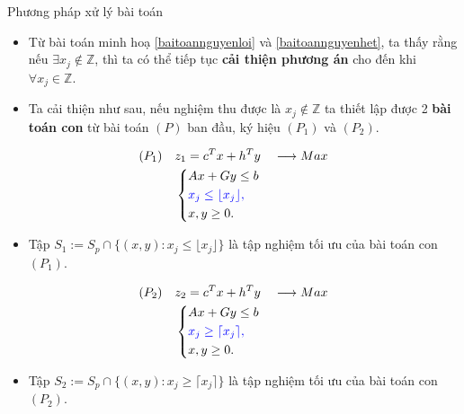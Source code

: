 \documentclass[10pt]{beamer}
\begin{document}
\begin{frame}{Phương pháp xử lý bài toán}
\large
\begin{itemize}
\item Từ bài toán minh hoạ \eqref{baitoannguyenloi} và \eqref{baitoannguyenhet}, ta thấy rằng nếu $\exists x_j \notin \mathbb{Z}$, thì ta có thể tiếp tục \textbf{cải thiện phương án} cho đến khi $\forall x_j \in \mathbb{Z}$. 
\bigskip
\item Ta cải thiện như sau, nếu nghiệm thu được là $x_j \notin \mathbb{Z}$ ta thiết lập được 2 \textbf{bài toán con} từ bài toán $(P)$ ban đầu, ký hiệu $(P_1)$ và $(P_2)$.
\end{itemize}
\end{frame}

\begin{frame}
\begin{equation}
    \begin{split}
    (P_1) \quad & z_1=c^Tx+h^Ty \quad \longrightarrow Max \\
                & \left\{\begin{split}
                    &Ax+Gy \leq  b \\
                    &\color{blue} x_j \leq \lfloor x_j \rfloor , \\
                    &x,y \geq 0.
                \end{split}\right.    
    \end{split}
\end{equation}
\begin{itemize}
\item Tập $S_1:=S_p \cap \{ (x,y): x_j \leq \lfloor x_j \rfloor \}$ là tập nghiệm tối ưu của bài toán con $(P_1)$.
\end{itemize}
\end{frame}

\begin{frame}
\begin{equation}
    \begin{split}
    (P_2) \quad & z_2=c^Tx+h^Ty \quad \longrightarrow Max \\
                & \left\{\begin{split}
                    &Ax+Gy \leq  b \\
                    &\color{blue} x_j \geq \lceil x_j \rceil , \\
                    &x,y \geq 0.
                \end{split}\right.    
    \end{split}
\end{equation}
\begin{itemize}
\item Tập $S_2:=S_p \cap \{ (x,y): x_j \geq \lceil x_j \rceil \}$ là tập nghiệm tối ưu của bài toán con $(P_2)$.
\end{itemize}
\end{frame}
\end{document}
